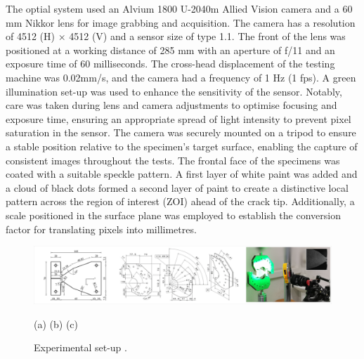 \documentclass[3p,times,procedia]{elsarticle}
\begin{document}
The optial system used an Alvium 1800 U-2040m Allied Vision camera and a 60 mm Nikkor lens for image grabbing and acquisition. The camera has a resolution of 4512 (H) $\times$ 4512 (V) and a sensor size of type 1.1. The front of the lens was positioned at a working distance of 285 mm with an aperture of f/11 and an exposure time of 60 milliseconds. The cross-head displacement of the testing machine was 0.02mm/s, and the camera had a frequency of 1 Hz (1 fps).
A green illumination set-up was used to enhance the sensitivity of the sensor. Notably, care was taken during lens and camera adjustments to optimise focusing and exposure time, ensuring an appropriate spread of light intensity to prevent pixel saturation in the sensor. The camera was securely mounted on a tripod to ensure a stable position relative to the specimen's target surface, enabling the capture of consistent images throughout the tests. The frontal face of the specimens was coated with a suitable speckle pattern. A first layer of white paint was added and a cloud of black dots formed a second layer of paint to create a distinctive local pattern across the region of interest (ZOI) ahead of the crack tip. Additionally, a scale positioned in the surface plane was employed to establish the conversion factor for translating pixels into millimetres.


\begin{figure}[t]
	\centering
	\includegraphics[width=\textwidth]{Fig1}
	\begin{minipage}{1.\textwidth}
	{\footnotesize (a) \hspace{4cm} (b) \hspace{6.5cm} (c)}
	\end{minipage}
	\caption{Experimental set-up \citep{MoutouPitti2008}.}
	\label{F:Fig1}
\end{figure}
\end{document}
